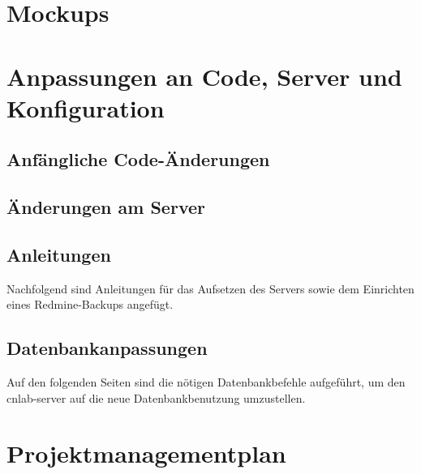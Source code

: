 \documentclass[12pt, a4paper]{report}
\begin{document}
	
	\chapter{Mockups}
	\label{chap:mockups}
	
	
	
	
	
	\chapter{Anpassungen an Code, Server und Konfiguration}
	
	\section{Anfängliche Code-Änderungen}
	\label{sec:AnfaenglicheCodeAenderungen}
	
	
	\newpage
	\section{Änderungen am Server}
	\label{sec:AenderungenAmServer}
	
	
	\section{Anleitungen}
	\label{sec:Anleitungen}
	Nachfolgend sind Anleitungen für das Aufsetzen des Servers sowie dem Einrichten eines Redmine-Backups angefügt.
	
	
	
	
	\section{Datenbankanpassungen}
	\label{sec:Datenbankanpassungen}
	Auf den folgenden Seiten sind die nötigen Datenbankbefehle aufgeführt, um den cnlab-server auf die neue Datenbankbenutzung umzustellen.
	
	
	\chapter{Projektmanagementplan}
	
\end{document}
